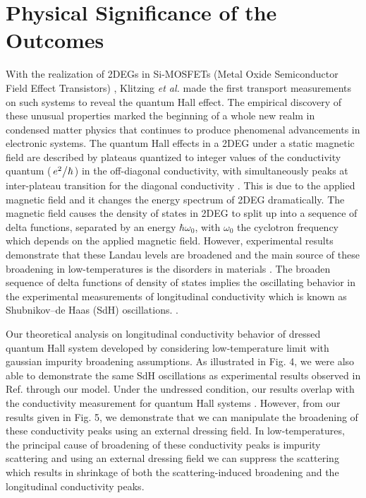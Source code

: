 \documentclass[
 reprint,
 amsmath,amssymb,
 aps,
 prb,
]{revtex4-2}
\begin{document}
{\color{Red}
\section{\label{sec:physical_significance} Physical Significance of the Outcomes}
With the realization of 2DEGs in Si-MOSFETs (Metal Oxide Semiconductor Field Effect Transistors) \citep{fowler66}, Klitzing \textit{et al.} \cite{klitzing80} made the first transport measurements on such systems to reveal the quantum Hall effect. The empirical discovery of these unusual properties marked the beginning of a whole new realm in condensed matter physics that continues to produce phenomenal advancements in electronic systems. The quantum Hall effects in a 2DEG under a static magnetic field are described by plateaus quantized to integer values of the conductivity quantum ($\flatfrac{e^2}{\hbar}$) in the off-diagonal conductivity, with simultaneously peaks at inter-plateau transition for the diagonal conductivity \cite{endo09}. This is due to the applied magnetic field and it changes the energy spectrum of 2DEG dramatically. The magnetic field causes the density of states in 2DEG to split up into a sequence of delta functions, separated by an energy $\hbar\omega_0$, with $\omega_0$ the cyclotron frequency which depends on the applied magnetic field.
However, experimental results demonstrate that these Landau levels are broadened and the main source of these broadening in low-temperatures is the disorders in materials \cite{ando85,dial07}. The broaden sequence of delta functions of density of states implies the oscillating behavior in the experimental measurements of longitudinal conductivity which is known as Shubnikov–de Haas (SdH) oscillations. \cite{endo09,wakabayashi78}.

Our theoretical analysis on longitudinal conductivity behavior of dressed quantum Hall system developed by considering low-temperature limit with gaussian impurity broadening assumptions. As illustrated in Fig. 4, we were also able to demonstrate the same SdH oscillations as experimental results observed in Ref.\cite{endo09,wakabayashi78} through our model. Under the undressed condition, our results overlap with the conductivity measurement for quantum Hall systems \cite{endo09}. However, from our results given in Fig. 5, we demonstrate that we can manipulate the broadening of these conductivity peaks using an external dressing field. In low-temperatures, the principal cause of broadening of these conductivity peaks is impurity scattering and using an external dressing field we can suppress the scattering which results in shrinkage of both the scattering-induced broadening and the longitudinal conductivity peaks.

}
\end{document}
